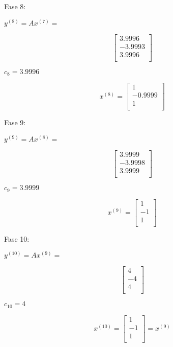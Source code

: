 Fase 8: 

\begin{center} 
$y^{(8)} = Ax^{(7)} =$
\end{center}
\[ 
    \left[ {\begin{array}{c}
   3.9996 \\
   -3.9993 \\
   3.9996 \\
  \end{array} } \right]
\]
\begin{center} 
$c_8 = 3.9996$ 


\[
x^{(8)} = 
  \left[ {\begin{array}{c}
   1  \\
   -0.9999 \\
   1 \\
  \end{array} } \right]
\]

\end{center}


Fase 9: 

\begin{center} 
$y^{(9)} = Ax^{(8)} =$
\end{center}
\[ 
    \left[ {\begin{array}{c}
   3.9999 \\
   -3.9998 \\
   3.9999 \\
  \end{array} } \right]
\]
\begin{center} 
$c_9 = 3.9999$ 


\[
x^{(9)} = 
  \left[ {\begin{array}{c}
   1  \\
   -1 \\
   1 \\
  \end{array} } \right]
\]

\end{center}


Fase 10: 

\begin{center} 
$y^{(10)} = Ax^{(9)} =$
\end{center}
\[ 
    \left[ {\begin{array}{c}
   4 \\
   -4 \\
   4 \\
  \end{array} } \right]
\]
\begin{center} 
$c_10 = 4$ 


\[
x^{(10)} = 
  \left[ {\begin{array}{c}
   1  \\
   -1 \\
   1 \\
  \end{array} } \right]
 =
x^{(9)} 
\]
\end{center}

